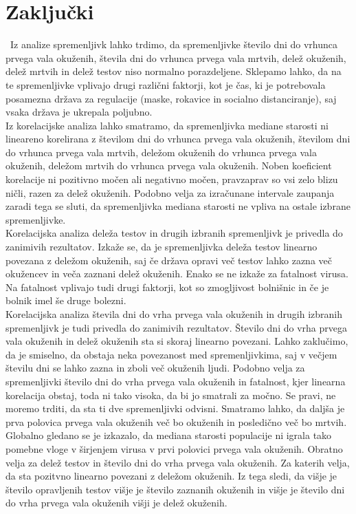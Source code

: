 \documentclass[a4paper,11pt]{article}
\begin{document}
\section{Zaključki}\
Iz analize spremenljivk lahko trdimo, da spremenljivke število dni do vrhunca prvega vala okuženih, števila dni do vrhunca prvega vala mrtvih, delež okuženih, delež mrtvih in delež testov niso normalno porazdeljene. Sklepamo lahko, da na te spremenljivke vplivajo drugi različni faktorji, kot je čas, ki je potrebovala posamezna država za regulacije (maske, rokavice in socialno distanciranje), saj vsaka država je ukrepala poljubno. \\
Iz korelacijske analiza lahko smatramo, da spremenljivka mediane starosti ni lineareno korelirana z številom dni do vrhunca prvega vala okuženih, številom dni do vrhunca prvega vala mrtvih, deležom okuženih do vrhunca prvega vala okuženih, deležom mrtvih do vrhunca prvega vala okuženih. Noben koeficient korelacije ni pozitivno močen ali negativno močen, pravzaprav so vsi zelo blizu ničli, razen za delež okuženih. Podobno velja za izračunane intervale zaupanja zaradi tega se sluti, da spremenljivka mediana starosti ne vpliva na ostale izbrane spremenljivke. \\
Korelacijska analiza deleža testov in drugih izbranih spremenljivk je privedla do zanimivih rezultatov. Izkaže se, da je spremenljivka deleža testov linearno povezana z deležom okuženih, saj če država opravi več testov lahko zazna več okužencev in veča zaznani delež okuženih. Enako se ne izkaže za fatalnost virusa. Na fatalnost vplivajo tudi drugi faktorji, kot so zmogljivost bolnišnic in če je bolnik imel še druge bolezni. \\
Korelacijska analiza števila dni do vrha prvega vala okuženih in drugih izbranih spremenljivk je tudi privedla do zanimivih rezultatov. Število dni do vrha prvega vala okuženih in delež okuženih sta si skoraj linearno povezani. Lahko zaklučimo, da je smiselno, da obstaja neka povezanost med spremenljivkima, saj v večjem številu dni se lahko zazna in zboli več okuženih ljudi. Podobno velja za spremenljivki število dni do vrha prvega vala okuženih in fatalnost, kjer linearna korelacija obstaj, toda ni tako visoka, da bi jo smatrali za močno. Se pravi, ne moremo trditi, da sta ti dve spremenljivki odvisni. Smatramo lahko, da daljša je prva polovica prvega vala okuženih več bo okuženih in posledično več bo mrtvih. \\
Globalno gledano se je izkazalo, da mediana starosti populacije ni igrala tako pomebne vloge v širjenjem virusa v prvi polovici prvega vala okuženih. Obratno velja za delež testov in število dni do vrha prvega vala okuženih. Za katerih velja, da sta pozitvno linearno povezani z deležom okuženih. Iz tega sledi, da višje je število opravljenih testov višje je število zaznanih okuženih in višje je število dni do vrha prvega vala okuženih višji je delež okuženih.
\end{document}
